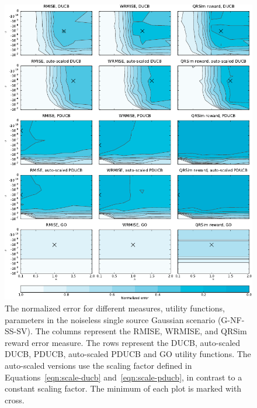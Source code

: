 \begin{figure}
    \centering
    \includegraphics{plots/psearch-G-NF-SS-SV}
    \caption[Normalized error (G-NF-SS-SV)]{The normalized error for different 
        measures, utility functions, parameters in the noiseless single source 
        Gaussian scenario (G-NF-SS-SV).  The columns represent the RMISE, 
        WRMISE, and QRSim reward error measure.  The rows represent the DUCB, 
        auto-scaled DUCB, PDUCB, auto-scaled PDUCB and GO utility functions. The 
        auto-scaled versions use the scaling factor defined in 
        Equations~\ref{eqn:scale-ducb} and~\ref{eqn:scale-pducb}, in contrast to 
        a constant scaling factor. The minimum of each plot is marked with 
        cross.}\label{fig:psearch-G-NF-SS-SV}
\end{figure}

